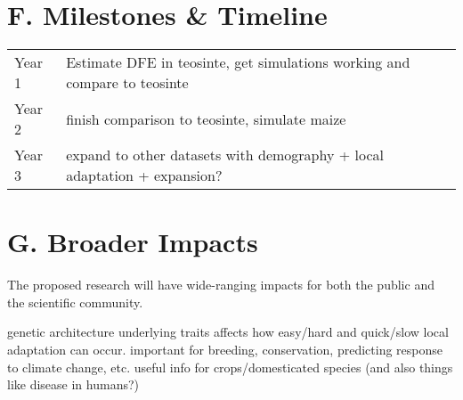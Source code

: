 {%
\section*{F. Milestones \& Timeline}
\begin{tabular}{ll}
Year 1 \hspace{0.5in} & Estimate DFE in teosinte, get simulations working and compare to teosinte \\
Year 2                     & finish comparison to teosinte, simulate maize \\
Year 3		& expand to other datasets with demography + local adaptation + expansion? \\
\end{tabular}
  


\section*{G. Broader Impacts}

The proposed research will have wide-ranging impacts for both the public and the scientific community.


genetic architecture underlying traits affects how easy/hard and quick/slow local adaptation can occur. important for breeding, conservation, predicting response to climate change, etc.
useful info for crops/domesticated species (and also things like disease in humans?) 

}

